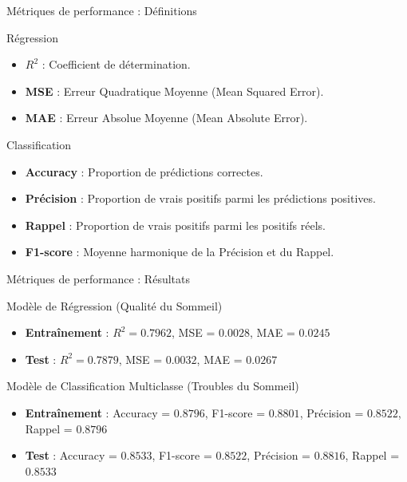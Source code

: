 \documentclass{beamer}
\begin{document}
\begin{frame}{Métriques de performance : Définitions}
    \begin{block}{Régression}
        \begin{itemize}
            \item \textbf{\boldmath$R^2$} : Coefficient de détermination.
            \item \textbf{MSE} : Erreur Quadratique Moyenne (Mean Squared Error).
            \item \textbf{MAE} : Erreur Absolue Moyenne (Mean Absolute Error).
        \end{itemize}
    \end{block}

    \begin{block}{Classification}
        \begin{itemize}
            \item \textbf{Accuracy} : Proportion de prédictions correctes.
            \item \textbf{Précision} : Proportion de vrais positifs parmi les prédictions positives.
            \item \textbf{Rappel} : Proportion de vrais positifs parmi les positifs réels.
            \item \textbf{F1-score} : Moyenne harmonique de la Précision et du Rappel.
        \end{itemize}
    \end{block}
\end{frame}


\begin{frame}{Métriques de performance : Résultats}
    \begin{block}{Modèle de Régression (Qualité du Sommeil)}
        \begin{itemize}
            \item \textbf{Entraînement} : $R^2 = 0.7962$, MSE = $0.0028$, MAE = $0.0245$
            \item \textbf{Test} : $R^2 = 0.7879$, MSE = $0.0032$, MAE = $0.0267$
        \end{itemize}
    \end{block}

    \begin{block}{Modèle de Classification Multiclasse (Troubles du Sommeil)}
        \begin{itemize}
            \item \textbf{Entraînement} : Accuracy = $0.8796$, F1-score = $0.8801$, Précision = $0.8522$, Rappel = $0.8796$
            \item \textbf{Test} : Accuracy = $0.8533$, F1-score = $0.8522$, Précision = $0.8816$, Rappel = $0.8533$
        \end{itemize}
    \end{block}
\end{frame}
\end{document}

